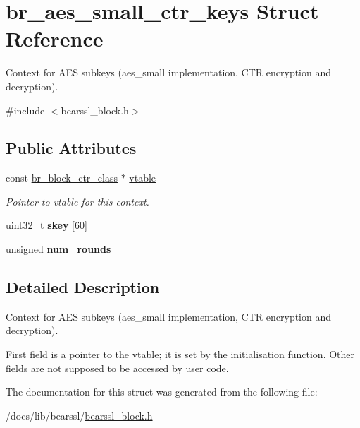 \hypertarget{structbr__aes__small__ctr__keys}{}\section{br\+\_\+aes\+\_\+small\+\_\+ctr\+\_\+keys Struct Reference}
\label{structbr__aes__small__ctr__keys}


Context for A\+ES subkeys ({\ttfamily aes\+\_\+small} implementation, C\+TR encryption and decryption).  




{\ttfamily \#include $<$bearssl\+\_\+block.\+h$>$}

\subsection*{Public Attributes}
\begin{DoxyCompactItemize}
\item 
\mbox{\label{structbr__aes__small__ctr__keys_adbd0f7217826e6ffc183845cc0dc1632}} 
const \hyperlink{bearssl__block_8h_a8934ac58af503220bfb6e6cbc2cfb209}{br\+\_\+block\+\_\+ctr\+\_\+class} $\ast$ \hyperlink{structbr__aes__small__ctr__keys_adbd0f7217826e6ffc183845cc0dc1632}{vtable}
\begin{DoxyCompactList}\small\item\em Pointer to vtable for this context. \end{DoxyCompactList}\item 
\mbox{\label{structbr__aes__small__ctr__keys_ab1b438d16a2f3b7bb3f6a10e45bc33ae}} 
uint32\+\_\+t {\bfseries skey} \mbox{[}60\mbox{]}
\item 
\mbox{\label{structbr__aes__small__ctr__keys_a7d2e562a7c5f179ba453d6f0ab3c13c5}} 
unsigned {\bfseries num\+\_\+rounds}
\end{DoxyCompactItemize}


\subsection{Detailed Description}
Context for A\+ES subkeys ({\ttfamily aes\+\_\+small} implementation, C\+TR encryption and decryption). 

First field is a pointer to the vtable; it is set by the initialisation function. Other fields are not supposed to be accessed by user code. 

The documentation for this struct was generated from the following file\+:\begin{DoxyCompactItemize}
\item 
/docs/lib/bearssl/\hyperlink{bearssl__block_8h}{bearssl\+\_\+block.\+h}\end{DoxyCompactItemize}
